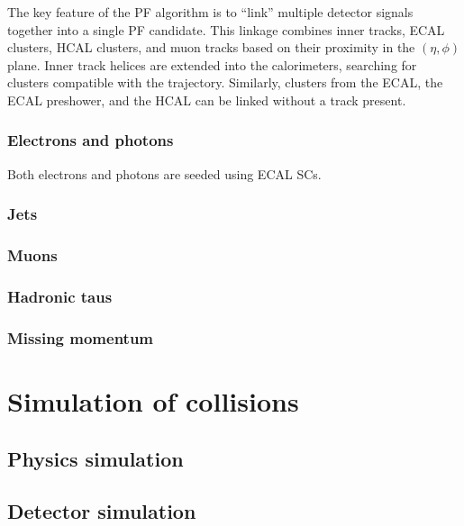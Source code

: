 The key feature of the PF algorithm is to ``link'' multiple detector signals together into a single PF candidate.
This linkage combines inner tracks, ECAL clusters, HCAL clusters, and muon tracks based on their proximity in the $(\eta,\phi)$ plane.
Inner track helices are extended into the calorimeters, searching for clusters compatible with the trajectory.
Similarly, clusters from the ECAL, the ECAL preshower, and the HCAL can be linked without a track present. 


\subsubsection{Electrons and photons}

Both electrons and photons are seeded using ECAL SCs.


\subsubsection{Jets}
\label{sec:cms:jets}

\subsubsection{Muons}

\subsubsection{Hadronic taus}

\subsubsection{Missing momentum}
\label{sec:cms:met}


\section{Simulation of collisions}

\subsection{Physics simulation}

\subsection{Detector simulation}

